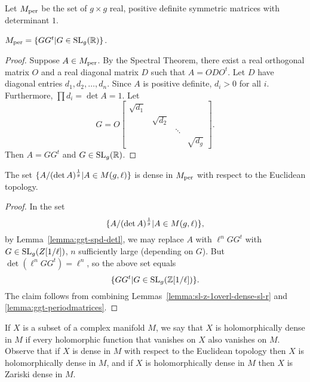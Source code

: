 \documentclass{amsart}
\begin{document}
\begin{definition}
  Let $M_{\textrm{per}}$ be the set of $g \times g$ real, positive definite symmetric matrices  with determinant $1$.
\end{definition}

\begin{lemma}\label{lemma:ggt-periodmatrices}
  $M_{\textrm{per}} = \{GG^t | G \in \operatorname{SL}_g(\mathbb{R})\}$.
\end{lemma}

\begin{proof}
  Suppose $A \in M_{\textrm{per}}$. By the Spectral Theorem, there exist a real orthogonal matrix $O$ and a real diagonal matrix $D$ such that $A = ODO^t$. Let $D$ have diagonal entries $d_1, d_2, \dots, d_n$. Since $A$ is positive definite, $d_i > 0$ for all $i$. Furthermore, $\prod d_i = \det A = 1$. Let
  \[
    G = O
    \begin{bmatrix}
      \sqrt{d_1} & & & \\
      & \sqrt{d_2} & & \\
      & & \ddots & \\
      & & & \sqrt{d_{g}}
    \end{bmatrix}.
\]
Then $A = GG^t$ and $G \in \operatorname{SL}_g(\mathbb{R})$.
\end{proof}

\begin{proposition}\label{prop:A-over-detA}
  The set ${\{A/(\det A)^{\frac{1}{g}} | A \in M(g,\ell)\}}$ is dense in $M_{\textrm{per}}$ with respect to the Euclidean topology.
\end{proposition}

\begin{proof}
  In the set
  \[
    \{A/(\det A)^{\frac{1}{g}} | A \in M(g,\ell)\},
  \]
  by Lemma~\ref{lemma:ggt-spd-detl}, we may replace $A$ with $\ell^n GG^t$ with $G \in \operatorname{SL}_g(Z[1/\ell])$, $n$ sufficiently large (depending on $G$). But $\det (\ell^n GG^t) = \ell^n$, so the above set equals
  \[
    \{GG^t | G \in \operatorname{SL}_g(\mathbb{Z}[1/\ell])\}.
  \]
  The claim follows from combining Lemmas~\ref{lemma:sl-z-1overl-dense-sl-r} and \ref{lemma:ggt-periodmatrices}.
\end{proof}

If $X$ is a subset of a complex manifold $M$, we say that $X$ is holomorphically dense in $M$ if every holomorphic function that vanishes on $X$ also vanishes on $M$. Observe that if $X$ is dense in $M$ with respect to the Euclidean topology then $X$ is holomorphically dense in $M$, and if $X$ is holomorphically dense in $M$ then $X$ is Zariski dense in $M$.
\end{document}
